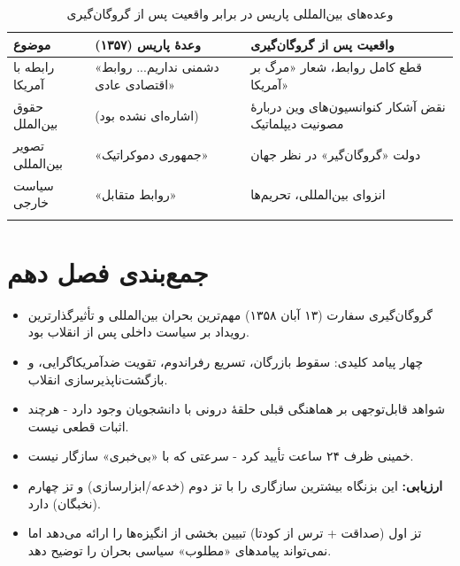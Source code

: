 \documentclass[12pt,a4paper]{book}
\newcommand{\keyword}[1]{\textbf{\textcolor{cPrimary}{#1}}}
\begin{document}
\begin{longtable}{%
    >{\raggedleft\arraybackslash}p{}
    >{\raggedleft\arraybackslash}p{}
    >{\raggedleft\arraybackslash}p{}}
\toprule
\rowcolor{cPrimary!10}
\textbf{موضوع} & \textbf{وعدهٔ پاریس (۱۳۵۷)} & \textbf{واقعیت پس از گروگان‌گیری} \\
\midrule
\endhead

رابطه با آمریکا &
«دشمنی نداریم... روابط اقتصادی عادی» &
قطع کامل روابط، شعار «مرگ بر آمریکا» \\
\midrule

حقوق بین‌الملل &
(اشاره‌ای نشده بود) &
نقض آشکار کنوانسیون‌های وین دربارهٔ مصونیت دیپلماتیک \\
\midrule

تصویر بین‌المللی &
«جمهوری دموکراتیک» &
دولت «گروگان‌گیر» در نظر جهان \\
\midrule

سیاست خارجی &
«روابط متقابل» &
انزوای بین‌المللی، تحریم‌ها \\

\bottomrule
\caption{وعده‌های بین‌المللی پاریس در برابر واقعیت پس از گروگان‌گیری}
\label{tab:promise-reality-intl}
\end{longtable}

\section{جمع‌بندی فصل دهم}

\begin{principleBox}
\begin{itemize}[label=\textcolor{cPrimary}{$\blacksquare$}, rightmargin=2em]
    \item گروگان‌گیری سفارت (۱۳ آبان ۱۳۵۸) مهم‌ترین بحران بین‌المللی و تأثیرگذارترین رویداد بر سیاست داخلی پس از انقلاب بود.
    \item چهار پیامد کلیدی: سقوط بازرگان، تسریع رفراندوم، تقویت ضدآمریکاگرایی، و بازگشت‌ناپذیرسازی انقلاب.
    \item شواهد قابل‌توجهی بر هماهنگی قبلی حلقهٔ درونی با دانشجویان وجود دارد - هرچند اثبات قطعی نیست.
    \item خمینی ظرف ۲۴ ساعت تأیید کرد - سرعتی که با «بی‌خبری» سازگار نیست.
    \item \keyword{ارزیابی:} این بزنگاه بیشترین سازگاری را با تز دوم (خدعه/ابزارسازی) و تز چهارم (نخبگان) دارد.
    \item تز اول (صداقت + ترس از کودتا) تبیین بخشی از انگیزه‌ها را ارائه می‌دهد اما نمی‌تواند پیامدهای «مطلوب» سیاسی بحران را توضیح دهد.
\end{itemize}
\end{principleBox}
\end{document}
